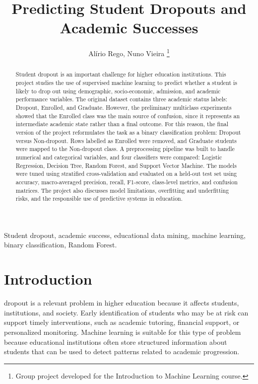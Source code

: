 \documentclass[lettersize,journal]{IEEEtran}
\begin{document}
\title{Predicting Student Dropouts and Academic Successes}

\author{Alírio Rego, Nuno Vieira%
\thanks{Group project developed for the Introduction to Machine Learning course.}}


\maketitle

\begin{abstract}
Student dropout is an important challenge for higher education institutions. This project studies the use of supervised machine learning to predict whether a student is likely to drop out using demographic, socio-economic, admission, and academic performance variables. The original dataset contains three academic status labels: Dropout, Enrolled, and Graduate. However, the preliminary multiclass experiments showed that the Enrolled class was the main source of confusion, since it represents an intermediate academic state rather than a final outcome. For this reason, the final version of the project reformulates the task as a binary classification problem: Dropout versus Non-dropout. Rows labelled as Enrolled were removed, and Graduate students were mapped to the Non-dropout class. A preprocessing pipeline was built to handle numerical and categorical variables, and four classifiers were compared: Logistic Regression, Decision Tree, Random Forest, and Support Vector Machine. The models were tuned using stratified cross-validation and evaluated on a held-out test set using accuracy, macro-averaged precision, recall, F1-score, class-level metrics, and confusion matrices. The project also discusses model limitations, overfitting and underfitting risks, and the responsible use of predictive systems in education.
\end{abstract}

\begin{IEEEkeywords}
Student dropout, academic success, educational data mining, machine learning, binary classification, Random Forest.
\end{IEEEkeywords}

\section{Introduction}
 dropout is a relevant problem in higher education because it affects students, institutions, and society. Early identification of students who may be at risk can support timely interventions, such as academic tutoring, financial support, or personalized monitoring. Machine learning is suitable for this type of problem because educational institutions often store structured information about students that can be used to detect patterns related to academic progression.
\end{document}
